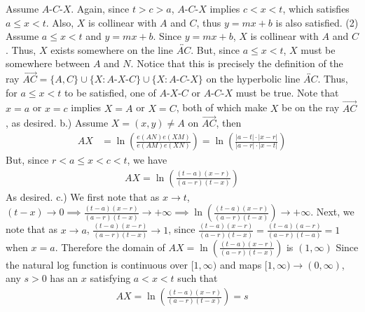 \documentclass{report}
\begin{document}
    \bigbreak \noindent 
    Assume $ A\text{-}C\text{-}X$. Again, since $t > c > a$, $ A\text{-}C\text{-}X$ implies $ c < x < t$, which satisfies $a \leq x < t$. Also, $X$ is collinear with $A$ and $C$, thus $y = mx+b$ is also satisfied.
    \bigbreak \noindent 
    (2) Assume $a \leq x < t$ and $y=mx+b$. Since $y = mx+b$, $X$ is collinear with $A$ and $C$. Thus, $X$ exists somewhere on the line $\overleftrightarrow{AC}$. But, since $a \leq x < t$, $X$ must be somewhere between $A$ and $N$. Notice that this is precisely the definition of the ray $\overrightarrow{AC} = \{A,C\} \cup \{X: A\text{-}X\text{-}C\} \cup \{X: A\text{-}C\text{-}X\}$ on the hyperbolic line $\overleftrightarrow{AC}$. Thus, for $a \leq x < t$ to be satisfied, one of $ A\text{-}X\text{-}C$ or $ A\text{-}C\text{-}X$ must be true.
    \bigbreak \noindent 
    Note that $x = a$ or $x=c$ implies $X = A$ or $X = C$, both of which make $X$ be on the ray $\overrightarrow{AC}$, as desired.
    \bigbreak \noindent 
    b.) Assume $X = (x,y) \ne A$ on $\overrightarrow{AC}$, then 
    \begin{align*}
        AX &= \ln{\left(\frac{e(AN)e(XM)}{e(AM)e(XN)}\right)} = \ln{\left(\frac{\left\lvert a-t \right\rvert \cdot \left\lvert x-r \right\rvert}{\left\lvert a-r \right\rvert \cdot \left\lvert x-t \right\rvert}\right)}
    \end{align*}
    But, since $r < a \leq x <  c < t$, we have
    \begin{align*}
        AX = \ln{\left(\frac{(t-a)(x-r)}{(a-r)(t-x)}\right)}
    \end{align*}
    As desired.
    \bigbreak \noindent 
    c.) We first note that as $x \to t$, $(t-x) \to 0 \implies \frac{(t-a)(x-r)}{(a-r)(t-x)} \to +\infty \implies \ln{\left(\frac{(t-a)(x-r)}{(a-r)(t-x)}\right)} \to +\infty$. Next, we note that as $x \to a$, $\frac{(t-a)(x-r)}{(a-r)(t-x)} \to 1$, since $ \frac{(t-a)(x-r)}{(a-r)(t-x)}  = \frac{(t-a)(a-r)}{(a-r)(t-a)} = 1$ when $x = a$. Therefore the domain of $AX = \ln{\left(\frac{(t-a)(x-r)}{(a-r)(t-x)}\right)} $ is $(1,\infty) $
    \bigbreak \noindent 
    Since the natural log function is continuous over $[1,\infty)$ and maps $[1,\infty) \to (0, \infty) $, any $s >0$ has an $x$ satisfying $a < x < t$ such that 
    \begin{align*}
        AX = \ln{\left(\frac{(t-a)(x-r)}{(a-r)(t-x)}\right)} = s
    \end{align*}
    \endpf
\end{document}
